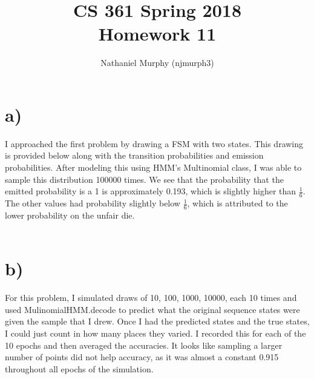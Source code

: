 \documentclass[11pt]{article}
\title{\textbf{CS 361 Spring 2018\\Homework 11}}
\author{Nathaniel Murphy (njmurph3)}
\date{}
\begin{document}
\maketitle
\section*{a)}
I approached the first problem by drawing a FSM with two states. This drawing is provided below along with the transition probabilities and emission probabilities. After modeling this using HMM's Multinomial class, I was able to sample this distribution 100000 times. We see that the probability that the emitted probability is a 1 is approximately 0.193, which is slightly higher than $\frac{1}{6}$. The other values had probability slightly below $\frac{1}{6}$, which is attributed to the lower probability on the unfair die. \\ \\
\section*{b)}
For this problem, I simulated draws of 10, 100, 1000, 10000, each 10 times and used MulinomialHMM.decode to predict what the original sequence states were given the sample that I drew. Once I had the predicted states and the true states, I could just count in how many places they varied. I recorded this for each of the 10 epochs and then averaged the accuracies. It looks like sampling a larger number of points did not help accuracy, as it was almost a constant 0.915 throughout all epochs of the simulation.
\end{document}
